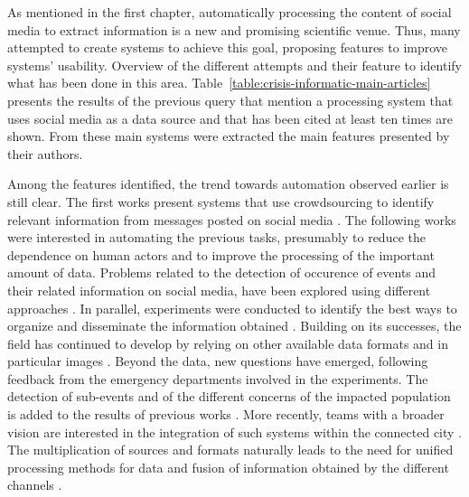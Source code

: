 As mentioned in the first chapter, automatically processing the content of social media to extract information is a new and promising scientific venue.
Thus, many attempted to create systems to achieve this goal, proposing features to improve systems' usability.
Overview of the different attempts and their feature to identify what has been done in this area.
Table~\ref{table:crisis-informatic-main-articles} presents the results of the previous query that mention a processing system that uses social media as a data source and that has been cited at least ten times are shown.
From these main systems were extracted the main features presented by their authors.

Among the features identified, the trend towards automation observed earlier is still clear.
The first works present systems that use crowdsourcing to identify relevant information from messages posted on social media
\parencite{schulzCrisisInformationManagement2012, backfriedOpenSourceIntelligence2012,imranAIDRArtificialIntelligence2014}.
The following works were interested in automating the previous tasks, presumably to reduce the dependence on human actors and to improve the processing of the important amount of data.
Problems related to the detection of occurence of events and their related information on social media, have been explored using different approaches \parencite{imranAIDRArtificialIntelligence2014,middletonRealtimeCrisisMapping2014,avvenutiEARSEarthquakeAlert2014, gibsonCombiningBigSocial2014}.
In parallel, experiments were conducted to identify the best ways to organize and disseminate the information obtained \parencite{middletonRealtimeCrisisMapping2014,huangDisasterMapperCyberGISFramework2015,avvenutiPullingInformationSocial2016,grunder-fahrerTopicsTopicalPhases2018}.
Building on its successes, the field has continued to develop by relying on other available data formats and in particular images \parencite{alamImage4ActOnlineSocial2017,nguyenAutomaticImageFiltering2017,agarwalCrisisDIASMultimodalDamage2020}.
Beyond the data, new questions have emerged, following feedback from the emergency departments involved in the experiments.
The detection of sub-events and of the different concerns of the impacted population is added to the results of previous works \parencite{wuStreamExplorerMultiStageSystem2018,raginiBigDataAnalytics2018,grunder-fahrerTopicsTopicalPhases2018}.
More recently, teams with a broader vision are interested in the integration of such systems within the connected city \parencite{shahDisasterResilientSmart2019}.
The multiplication of sources and formats naturally leads to the need for unified processing methods for data and fusion of information obtained by the different channels \parencite{alamDescriptiveVisualSummaries2020}.

